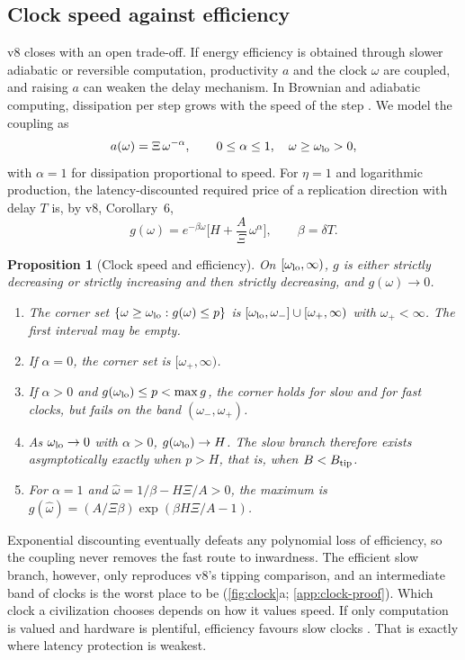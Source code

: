 \documentclass[11pt,a4paper]{article}
\newtheorem{proposition}{Proposition}
\theoremstyle{definition}
\newcommand{\Btip}{B_{\rm tip}}
\begin{document}
\subsection{Clock speed against efficiency}
v8 closes with an open trade-off. If energy efficiency is obtained through
slower adiabatic or reversible computation, productivity $a$ and the clock
$\omega$ are coupled, and raising $a$ can weaken the delay mechanism. In
Brownian and adiabatic computing, dissipation per step grows with the speed of
the step \citep{Bennett1982}. We model the coupling as
\begin{equation}
 a(\omega)=\Xi\,\omega^{-\alpha},\qquad 0\leq\alpha\leq1,\quad
 \omega\geq\omega_{\rm lo}>0,
 \label{eq:coupling}
\end{equation}
with $\alpha=1$ for dissipation proportional to speed. For $\eta=1$ and
logarithmic production, the latency-discounted required price of a replication
direction with delay $T$ is, by v8, Corollary~6,
\begin{equation}
 g(\omega)=e^{-\beta\omega}\Big[H+\frac A\Xi\,\omega^\alpha\Big],\qquad
 \beta=\delta T.
 \label{eq:g}
\end{equation}

\begin{proposition}[Clock speed and efficiency]
\label{prop:clock}
On $[\omega_{\rm lo},\infty)$, $g$ is either strictly decreasing or strictly
increasing and then strictly decreasing, and $g(\omega)\to0$.
\begin{enumerate}[label=(\roman*),leftmargin=*,nosep]
\item The corner set $\{\omega\geq\omega_{\rm lo}:g(\omega)\leq p\}$ is
$[\omega_{\rm lo},\omega_-]\cup[\omega_+,\infty)$ with $\omega_+<\infty$. The
first interval may be empty.
\item If $\alpha=0$, the corner set is $[\omega_+,\infty)$.
\item If $\alpha>0$ and $g(\omega_{\rm lo})\leq p<\max g$, the corner holds for
slow and for fast clocks, but fails on the band $(\omega_-,\omega_+)$.
\item As $\omega_{\rm lo}\to0$ with $\alpha>0$, $g(\omega_{\rm lo})\to H$. The slow
branch therefore exists asymptotically exactly when $p>H$, that is, when
$B<\Btip$.
\item For $\alpha=1$ and $\hat\omega=1/\beta-H\Xi/A>0$, the maximum is
$g(\hat\omega)=(A/\Xi\beta)\exp(\beta H\Xi/A-1)$.
\end{enumerate}
\end{proposition}
\noindent Exponential discounting eventually defeats any polynomial loss of
efficiency, so the coupling never removes the fast route to inwardness. The
efficient slow branch, however, only reproduces v8's tipping comparison, and
an intermediate band of clocks is the worst place to be
(\cref{fig:clock}a; \cref{app:clock-proof}). Which clock a civilization chooses
depends on how it values speed. If only computation is valued and hardware is
plentiful, efficiency favours slow clocks
\citep{Dyson1979,Sandberg2017}. That is exactly where latency protection is
weakest.
\end{document}
